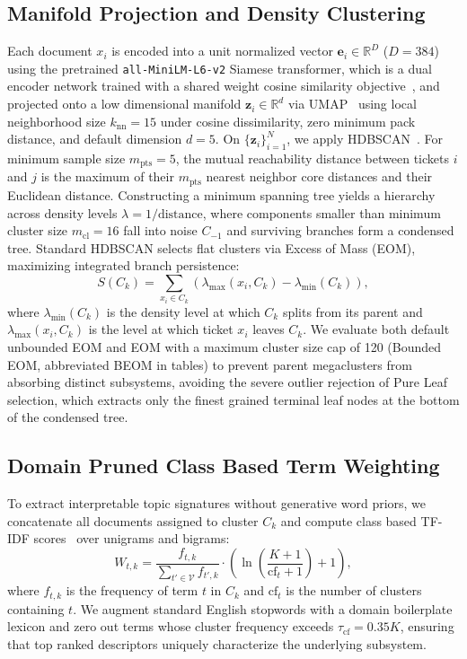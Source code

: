 \documentclass[sigconf,anonymous,pbalance]{acmart}
\begin{document}
\subsection{Manifold Projection and Density Clustering}
Each document $x_i$ is encoded into a unit normalized vector $\mathbf{e}_i \in \mathbb{R}^{D}$ ($D = 384$) using the pretrained \texttt{all-MiniLM-L6-v2} Siamese transformer, which is a dual encoder network trained with a shared weight cosine similarity objective~\cite{reimers2019sentence, wang2020minilm}, and projected onto a low dimensional manifold $\mathbf{z}_i \in \mathbb{R}^{d}$ via UMAP~\cite{mcinnes2018umap} using local neighborhood size $k_{\text{nn}} = 15$ under cosine dissimilarity, zero minimum pack distance, and default dimension $d = 5$. On $\{\mathbf{z}_i\}_{i=1}^{N}$, we apply HDBSCAN~\cite{campello2013density, mcinnes2017hdbscan}. For minimum sample size $m_{\text{pts}} = 5$, the mutual reachability distance between tickets $i$ and $j$ is the maximum of their $m_{\text{pts}}$ nearest neighbor core distances and their Euclidean distance. Constructing a minimum spanning tree yields a hierarchy across density levels $\lambda = 1 / \text{distance}$, where components smaller than minimum cluster size $m_{\text{cl}} = 16$ fall into noise $C_{-1}$ and surviving branches form a condensed tree. Standard HDBSCAN selects flat clusters via Excess of Mass (EOM), maximizing integrated branch persistence:
\begin{equation}
\label{eq:eom}
S(C_k) = \sum_{x_i \in C_k} \left( \lambda_{\text{max}}(x_i, C_k) - \lambda_{\text{min}}(C_k) \right),
\end{equation}
where $\lambda_{\text{min}}(C_k)$ is the density level at which $C_k$ splits from its parent and $\lambda_{\text{max}}(x_i, C_k)$ is the level at which ticket $x_i$ leaves $C_k$. We evaluate both default unbounded EOM and EOM with a maximum cluster size cap of 120 (Bounded EOM, abbreviated BEOM in tables) to prevent parent megaclusters from absorbing distinct subsystems, avoiding the severe outlier rejection of Pure Leaf selection, which extracts only the finest grained terminal leaf nodes at the bottom of the condensed tree.

\subsection{Domain Pruned Class Based Term Weighting}
To extract interpretable topic signatures without generative word priors, we concatenate all documents assigned to cluster $C_k$ and compute class based TF-IDF scores~\cite{grootendorst2022bertopic} over unigrams and bigrams:
\begin{equation}
\label{eq:ctfidf}
W_{t, k} = \frac{f_{t, k}}{\sum_{t' \in \mathcal{V}} f_{t', k}} \cdot \left( \ln \left( \frac{K + 1}{\text{cf}_t + 1} \right) + 1 \right),
\end{equation}
where $f_{t, k}$ is the frequency of term $t$ in $C_k$ and $\text{cf}_t$ is the number of clusters containing $t$. We augment standard English stopwords with a domain boilerplate lexicon and zero out terms whose cluster frequency exceeds $\tau_{\text{cf}} = 0.35 K$, ensuring that top ranked descriptors uniquely characterize the underlying subsystem.
\end{document}
